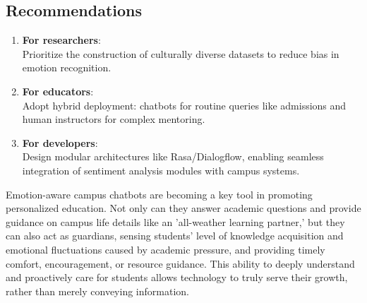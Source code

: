\documentclass{xum_review}
\begin{document}
\subsection{Recommendations}

\begin{enumerate}
    \item \textbf{For researchers}:\\Prioritize the construction of culturally diverse
    datasets to reduce bias in emotion recognition.
    \item \textbf{For educators}:\\Adopt hybrid deployment: chatbots for routine
    queries like admissions and human instructors for complex mentoring.
    \item \textbf{For developers}:\\Design modular architectures like
    Rasa/Dialogflow, enabling seamless integration of sentiment analysis modules
    with campus systems.
\end{enumerate}

Emotion-aware campus chatbots are becoming a key tool in promoting personalized
education. Not only can they answer academic questions and provide guidance on
campus life details like an 'all-weather learning partner,' but they can also
act as guardians, sensing students' level of knowledge acquisition and emotional
fluctuations caused by academic pressure, and providing timely comfort,
encouragement, or resource guidance. This ability to deeply understand and
proactively care for students allows technology to truly serve their growth,
rather than merely conveying information.


\end{document}
